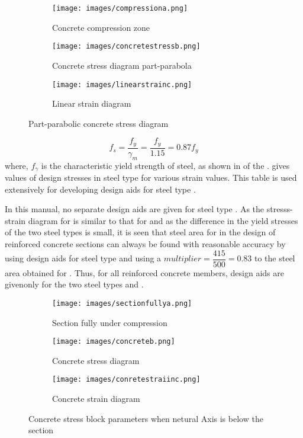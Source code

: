 \begin{figure}
\begin{subfigure}{0.3\textwidth}
\centering
\texttt{[image: images/compressiona.png]}
\caption{Concrete compression zone}
\label{fig:compression}
\end{subfigure}
%
\begin{subfigure}{0.3\textwidth}
\centering
\texttt{[image: images/concretestressb.png]}
\caption{Concrete stress diagram part-parabola}
\label{fig:stress}
\end{subfigure}
%
\begin{subfigure}{0.3\textwidth}
\centering
\texttt{[image: images/linearstrainc.png]}
\caption{Linear strain diagram}
\label{fig:strain}
\end{subfigure}
\caption{Part-parabolic concrete stress diagram}
\label{fig:part}
\end{figure}

\begin{equation}
f_s=\frac{f_y}{\gamma_m}=\frac{f_y}{1.15}=0.87f_y
\end{equation}
where, $f_\gamma$ is the characteristic yield strength of steel, as shown in
 of the .  gives values of design
stresses in steel type {\fefouronefive} for various strain values.
This table is used extensively for developing design aids for steel
type {\fefouronefive}. 

In this manual, no separate design aids are given
for steel type {\fefivezerozero}. As the stresss-strain diagram for
{\fefivezerozero} is similar to that for {\fefouronefive} and as the
difference in the yield stresses of the two steel types is small, it
is seen that steel area for {\fefivezerozero}  in the design of
reinforced concrete sections can always be found with reasonable
accuracy by using design aids for steel type {\fefouronefive} and using
a $multiplier=\dfrac{415}{500} = 0.83$ to the steel area obtained for
{\fefouronefive}. Thus, for all reinforced concrete members, design aids
are givenonly for the two steel types {\fetwofivezero} and {\fefouronefive}.

\begin{figure}
\centering
\begin{subfigure}{0.3\textwidth}
\centering
\texttt{[image: images/sectionfullya.png]}
\caption{Section fully under compression}
\label{fig:section}
\end{subfigure}
%
\begin{subfigure}{0.3\textwidth}
\centering
\texttt{[image: images/concreteb.png]}
\caption{Concrete stress diagram}
\label{fig:sec}
\end{subfigure}
%
\begin{subfigure}{0.3\textwidth}
\centering
\texttt{[image: images/conretestraiinc.png]}
\caption{Concrete strain diagram}
\label{fig:con}
\end{subfigure}
\caption{Concrete stress block parameters when netural Axis is below the section}
\label{fig:block}
\end{figure}


